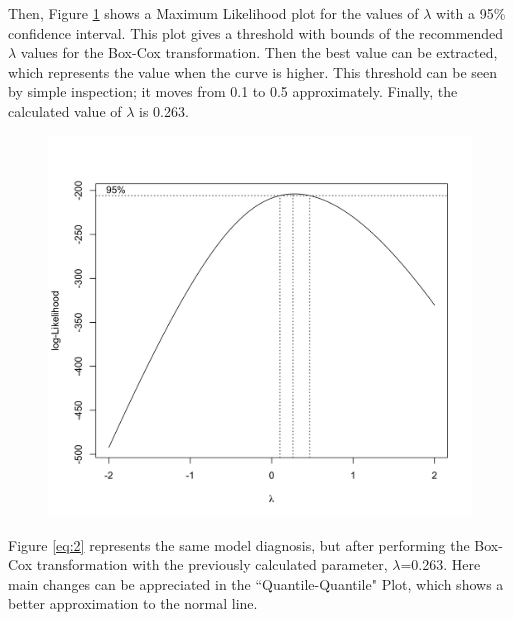 \documentclass[10pt,leter,openany]{article}
\begin{document}
		Then, Figure  \ref{fig:max_likelihood} shows a Maximum Likelihood plot for the values of $\lambda$ with a 95\% confidence interval. This plot gives a threshold with bounds of the recommended $\lambda$ values for the Box-Cox transformation. Then the best value can be extracted, which represents the value when the curve is higher. This threshold can be seen by simple inspection; it moves from 0.1 to 0.5 approximately. Finally, the calculated value of $\lambda$ is 0.263.

		\begin{figure}
			\begin{center}
				\includegraphics[scale=0.20]{extras/likelihood}
				\label{fig:max_likelihood}
			\end{center}
		\end{figure}

		Figure \ref{eq:2} represents the same model diagnosis, but after performing the Box-Cox transformation with the previously calculated parameter, $\lambda$=0.263. Here main changes can be appreciated in the ``Quantile-Quantile" Plot, which shows a better approximation to the normal line.
\end{document}
